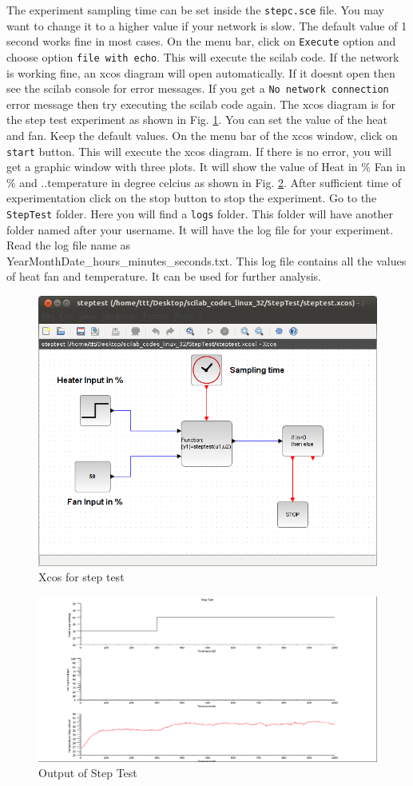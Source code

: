 The experiment sampling time can be set inside the  {\tt stepc.sce} file. You may want to change it to a higher value if your network is slow. The default value of 1 second works fine in most cases. On the menu bar, click on {\tt Execute} option and choose option {\tt file with echo}. This will execute  the scilab code. If the network is working fine, an xcos diagram will open automatically. If it doesnt open then see the scilab console for error messages. If you get a {\tt No network connection} error message then try executing the scilab code again. The xcos diagram is for the step test experiment as shown in Fig. \ref{step-xcos}. You can set the value of the heat and fan. Keep the default values. On the menu bar of the xcos window, click on {\tt start} button. This will execute the xcos diagram. If there is no error, you will get a graphic window with three plots. It will show the value of Heat in \% Fan in \% and ..temperature in degree celcius as shown in Fig. \ref{step-plot}. After sufficient time of experimentation click on the stop button to stop the experiment. Go to the {\tt StepTest} folder. Here you will find a {\tt logs} folder. This folder will have another folder named after your username. It will have the log file for your experiment. Read the log file name as\\ YearMonthDate\_hours\_minutes\_seconds.txt. This log file contains all the values of heat fan and temperature. It can be used for further analysis.

\begin{figure}
\centering
\includegraphics[width=0.7\linewidth]{vlabs/step-xcos.png}
\caption{Xcos for step test}
\label{step-xcos}
\end{figure}

\begin{figure}
\centering
\includegraphics[width=0.7\linewidth]{vlabs/step-test-output.png}
\caption{Output of Step Test}
\label{step-plot}
\end{figure}


